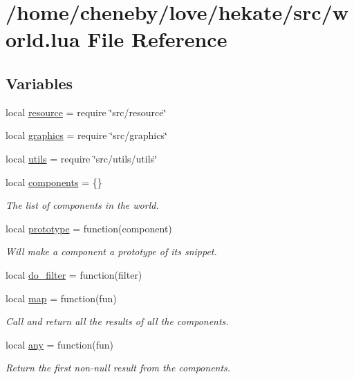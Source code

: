 \hypertarget{world_8lua}{\section{/home/cheneby/love/hekate/src/world.lua File Reference}
\label{world_8lua}
}
\subsection*{Variables}
\begin{DoxyCompactItemize}
\item 
local \hyperlink{world_8lua_a24ad487107aaa56bef35825abbe9773d}{resource} = require \char`\"{}src/resource\char`\"{}
\item 
local \hyperlink{world_8lua_aae06ace8bee01f93d02dfaa4436de916}{graphics} = require \char`\"{}src/graphics\char`\"{}
\item 
local \hyperlink{world_8lua_a9b2ba82def3d3656dc370bac0a641700}{utils} = require \char`\"{}src/utils/utils\char`\"{}
\item 
local \hyperlink{world_8lua_af7702afefbc3cd7e488ba6bc516519d5}{components} = \{\}
\begin{DoxyCompactList}\small\item\em The list of components in the world. \end{DoxyCompactList}\item 
local \hyperlink{world_8lua_adce4dc6841964c7ca862c109ca993b97}{prototype} = function(component)
\begin{DoxyCompactList}\small\item\em Will make a component a prototype of its snippet. \end{DoxyCompactList}\item 
local \hyperlink{world_8lua_a1f66d7d4da3c0131a8ef373be509e1ef}{do\-\_\-filter} = function(filter)
\item 
local \hyperlink{world_8lua_a39ec1e5339699aba0ebc7e3bb83856e7}{map} = function(fun)
\begin{DoxyCompactList}\small\item\em Call and return all the results of all the components. \end{DoxyCompactList}\item 
local \hyperlink{world_8lua_abd7045ad8553e16c50a967b4d48b7f6b}{any} = function(fun)
\begin{DoxyCompactList}\small\item\em Return the first non-\/null result from the components. \end{DoxyCompactList}\item 

\end{DoxyCompactItemize}
